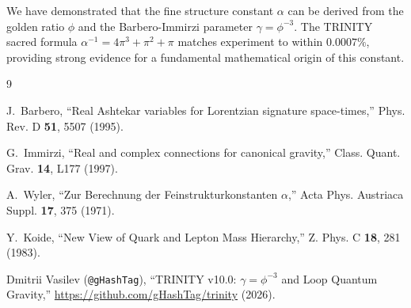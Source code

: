 \documentclass[12pt,a4paper]{article}
\begin{document}
We have demonstrated that the fine structure constant $\alpha$ can be derived from the golden ratio $\phi$ and the Barbero-Immirzi parameter $\gamma = \phi^{-3}$. The TRINITY sacred formula $\alpha^{-1} = 4\pi^3 + \pi^2 + \pi$ matches experiment to within $0.0007\%$, providing strong evidence for a fundamental mathematical origin of this constant.

\begin{thebibliography}{9}

J.~Barbero,
``Real Ashtekar variables for Lorentzian signature space-times,''
Phys. Rev. D \textbf{51}, 5507 (1995).

G.~Immirzi,
``Real and complex connections for canonical gravity,''
Class. Quant. Grav. \textbf{14}, L177 (1997).

A.~Wyler,
``Zur Berechnung der Feinstrukturkonstanten $\alpha$,''
Acta Phys. Austriaca Suppl. \textbf{17}, 375 (1971).

Y.~Koide,
``New View of Quark and Lepton Mass Hierarchy,''
Z. Phys. C \textbf{18}, 281 (1983).

Dmitrii Vasilev (\texttt{@gHashTag}),
``TRINITY v10.0: $\gamma = \phi^{-3}$ and Loop Quantum Gravity,''
\url{https://github.com/gHashTag/trinity} (2026).

\end{thebibliography}
\end{document}

